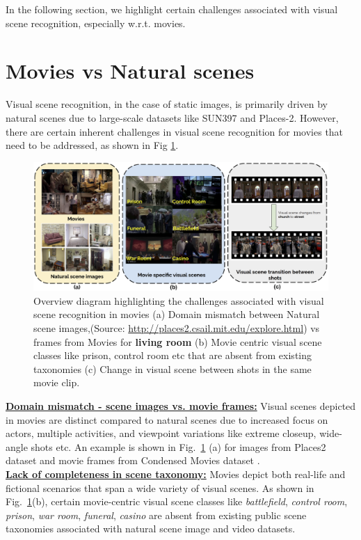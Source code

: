 In the following section, we highlight certain challenges associated with visual scene recognition, especially w.r.t. movies.
\section{Movies vs Natural scenes}
Visual scene recognition, in the case of static images, is primarily driven by natural scenes due to large-scale datasets like SUN397 \cite{Xiao2010SUNDL} and Places-2\cite{zhou2017places}. However, there are certain inherent challenges in visual scene recognition for movies that need to be addressed, as shown in Fig \ref{Intro figure}.
\begin{figure}[!h]
 \centering
  \includegraphics[width=0.8\linewidth]{figures/Introduction_Figure.png}
  \caption{Overview diagram highlighting the challenges associated with visual scene recognition in movies (a) Domain mismatch between Natural scene images,(Source: \url{http://places2.csail.mit.edu/explore.html}) vs frames from Movies for \textbf{living room} (b) Movie centric visual scene classes like prison, control room etc that are absent from existing taxonomies (c) Change in visual scene between shots in the same movie clip.}
  \label{Intro figure}
\end{figure}
\textbf{\underline{Domain mismatch - scene images vs. movie frames:}} Visual scenes depicted in movies are distinct compared to natural scenes due to increased focus on actors, multiple activities, and viewpoint variations like extreme closeup, wide-angle shots etc. An example is shown in Fig.~\ref{Intro figure} (a) for images from Places2 dataset \cite{zhou2017places} and movie frames from Condensed Movies dataset \cite{bain2020condensed}.\\
\textbf{\underline{Lack of completeness in scene taxonomy:}} Movies depict both real-life and fictional scenarios that span a wide variety of visual scenes. As shown in Fig.~\ref{Intro figure}(b), certain movie-centric visual scene classes like \textit{battlefield}, \textit{control room}, \textit{prison}, \textit{war room}, \textit{funeral}, \textit{casino} are absent from existing public scene taxonomies associated with natural scene image and video datasets.\\
